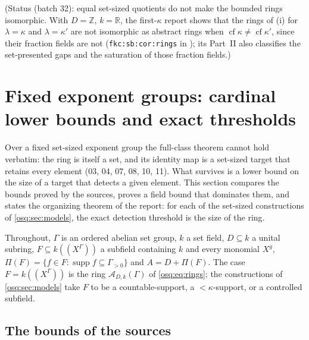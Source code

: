 \documentclass[11pt,letterpaper]{article}
\numberwithin{equation}{section}
\theoremstyle{definition}
\theoremstyle{remark}
\theoremstyle{plain}
\newcommand{\Z}{\mathbb Z}
\newcommand{\R}{\mathbb R}
\newcommand{\A}{\mathcal A}          %
\newcommand{\hahn}[2]{#1(\!(X^{#2})\!)}
\newcommand{\supp}{\operatorname{supp}}
\begin{document}
(Status (batch 32): equal set-sized quotients do not make the bounded rings isomorphic. With $D=\Z$, $k=\R$, the
first-$\kappa$ report shows that the rings of (i) for $\lambda=\kappa$ and $\lambda=\kappa'$ are not isomorphic as
abstract rings when $\operatorname{cf}\kappa\ne\operatorname{cf}\kappa'$, since their fraction fields are not
(\nolinkurl{fkc:sb:cor:rings} in \cite{RepoFKC}); its Part~II also classifies the set-presented gaps and the
saturation of those fraction fields.)

\section{Fixed exponent groups: cardinal lower bounds and exact thresholds}\label{osq:sec:fixed}

Over a fixed set-sized exponent group the full-class theorem cannot hold verbatim: the ring
is itself a set, and its identity map is a set-sized target that retains every element
(03, 04, 07, 08, 10, 11). What survives is a lower bound on the size of a target that
detects a given element. This section compares the bounds proved by the sources, proves a
field bound that dominates them, and states the organizing theorem of the report: for each
of the set-sized constructions of \cref{osq:sec:models}, the exact detection threshold is
the size of the ring.

Throughout, $\Gamma$ is an ordered abelian set group, $k$ a set field, $D\subseteq k$ a
unital subring, $F\subseteq\hahn k\Gamma$ a subfield containing $k$ and every monomial
$X^g$, $\Pi(F)=\{f\in F:\supp f\subseteq\Gamma_{>0}\}$ and $A=D+\Pi(F)$. The case
$F=\hahn k\Gamma$ is the ring $\A_{D,k}(\Gamma)$ of \eqref{osq:eq:rings}; the constructions of
\cref{osq:sec:models} take $F$ to be a countable-support, a $<\kappa$-support, or a
controlled subfield.

\subsection{The bounds of the sources}\label{osq:sub:sourcebounds}
\end{document}
